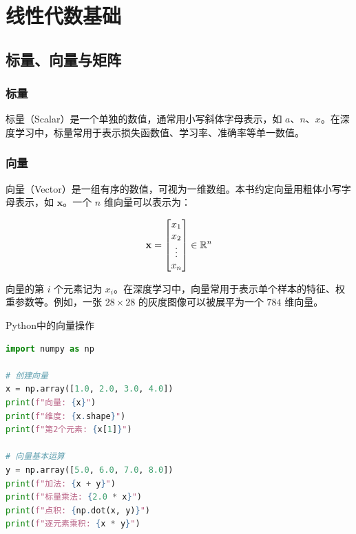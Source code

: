 \chapter{线性代数基础}


\section{标量、向量与矩阵}

\subsection{标量}

标量（Scalar）是一个单独的数值，通常用小写斜体字母表示，如 $a$、$n$、$x$。在深度学习中，标量常用于表示损失函数值、学习率、准确率等单一数值。

\subsection{向量}

向量（Vector）是一组有序的数值，可视为一维数组。本书约定向量用粗体小写字母表示，如 $\mathbf{x}$。一个 $n$ 维向量可以表示为：

\[
\mathbf{x} = \begin{bmatrix} x_1 \\ x_2 \\ \vdots \\ x_n \end{bmatrix} \in \mathbb{R}^n
\]

向量的第 $i$ 个元素记为 $x_i$。在深度学习中，向量常用于表示单个样本的特征、权重参数等。例如，一张 $28\times 28$ 的灰度图像可以被展平为一个 $784$ 维向量。

\begin{mycode}{Python中的向量操作}
\begin{lstlisting}[language=Python]
import numpy as np

# 创建向量
x = np.array([1.0, 2.0, 3.0, 4.0])
print(f"向量: {x}")
print(f"维度: {x.shape}")
print(f"第2个元素: {x[1]}")

# 向量基本运算
y = np.array([5.0, 6.0, 7.0, 8.0])
print(f"加法: {x + y}")
print(f"标量乘法: {2.0 * x}")
print(f"点积: {np.dot(x, y)}")
print(f"逐元素乘积: {x * y}")
\end{lstlisting}
\end{mycode}

